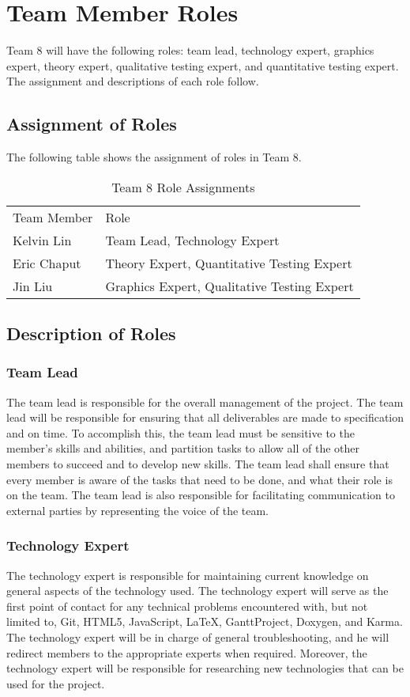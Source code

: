 \documentclass{article}
\begin{document}
\section{Team Member Roles}
Team 8 will have the following roles: team lead, technology expert, graphics 
expert, theory expert, qualitative testing expert, and quantitative testing 
expert. The assignment and descriptions of each role follow.

\subsection{Assignment of Roles}
The following table shows the assignment of roles in Team 8.

\begin{table}[h!]
	\begin{tabular}{ll}
		Team Member & Role                                        \\
		Kelvin Lin  & Team Lead, Technology Expert                \\
		Eric Chaput & Theory Expert, Quantitative Testing Expert  \\
		Jin Liu     & Graphics Expert, Qualitative Testing Expert
	\end{tabular}

	\caption{Team 8 Role Assignments}
\end{table}

\subsection{Description of Roles}

\subsubsection{Team Lead}
The team lead is responsible for the overall management of the project. The team 
lead will be responsible for ensuring that all deliverables are made to 
specification and on time. To accomplish this, the team lead must be sensitive 
to the member's skills and abilities, and partition tasks to allow all of the 
other members to succeed and to develop new skills. The team lead shall ensure 
that every member is aware of the tasks that need to be done, and what their 
role is on the team. The team lead is also responsible for facilitating 
communication to external parties by representing the voice of the team.

\subsubsection{Technology Expert}
The technology expert is responsible for maintaining current knowledge on 
general aspects of the technology used. The technology expert will serve as the 
first point of contact for any technical problems encountered with, but not 
limited to, Git, HTML5, JavaScript, \LaTeX, GanttProject, Doxygen, and Karma. 
The technology expert will be in charge of general troubleshooting, and he will 
redirect members to the appropriate experts when required. Moreover, the 
technology expert will be responsible for researching new technologies that can 
be used for the project.
\end{document}
